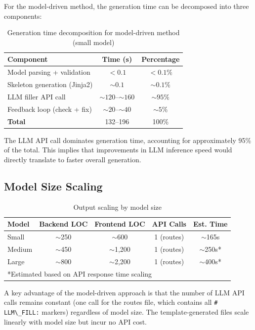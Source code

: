 \documentclass[11pt,a4paper]{article}
\begin{document}
{{For the model-driven method, the generation time can be decomposed into three components:

\begin{table}[H]
\centering
\caption{Generation time decomposition for model-driven method (small model)}
\label{tab:time-decomp}
\begin{tabular}{lcc}
\toprule
\textbf{Component} & \textbf{Time (s)} & \textbf{Percentage} \\
\midrule
Model parsing + validation    & $<0.1$ & $<0.1\%$ \\
Skeleton generation (Jinja2)  & $\sim0.1$ & $\sim0.1\%$ \\
LLM filler API call           & $\sim120$--$\sim160$ & $\sim95\%$ \\
Feedback loop (check + fix)   & $\sim20$--$\sim40$ & $\sim5\%$ \\
\midrule
\textbf{Total} & 132--196 & 100\% \\
\bottomrule
\end{tabular}
\end{table}

The LLM API call dominates generation time, accounting for approximately 95\% of the total. This implies that improvements in LLM inference speed would directly translate to faster overall generation.

\subsection{Model Size Scaling}

\begin{table}[H]
\centering
\caption{Output scaling by model size}
\label{tab:scale-output}
\begin{tabular}{lcccc}
\toprule
\textbf{Model} & \textbf{Backend LOC} & \textbf{Frontend LOC} & \textbf{API Calls} & \textbf{Est. Time} \\
\midrule
Small  & $\sim$250  & $\sim$600  & 1 (routes) & $\sim$165s \\
Medium & $\sim$450  & $\sim$1,200 & 1 (routes) & $\sim$250s* \\
Large  & $\sim$800  & $\sim$2,200 & 1 (routes) & $\sim$400s* \\
\bottomrule
\multicolumn{5}{l}{*Estimated based on API response time scaling} \\
\end{tabular}
\end{table}

A key advantage of the model-driven approach is that the number of LLM API calls remains constant (one call for the routes file, which contains all {\lstinline|# LLM\_FILL:|} markers) regardless of model size. The template-generated files scale linearly with model size but incur no API cost.

}}
\end{document}
